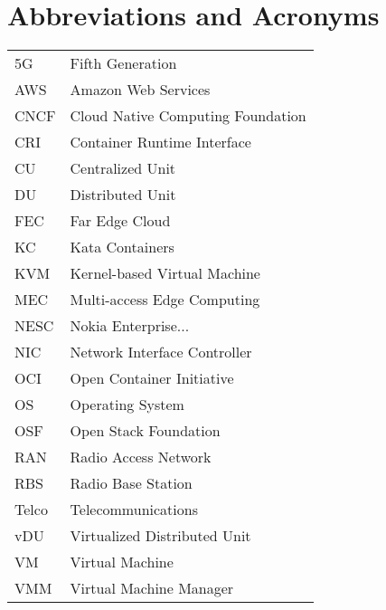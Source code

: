 \chapter*{Abbreviations and Acronyms}

\noindent
\begin{longtable}{@{}p{}p{}@{}}
5G & Fifth Generation \\
AWS & Amazon Web Services \\
CNCF & Cloud Native Computing Foundation \\
CRI & Container Runtime Interface \\
CU & Centralized Unit \\
DU & Distributed Unit \\
FEC & Far Edge Cloud \\
KC & Kata Containers \\
KVM & Kernel-based Virtual Machine \\
MEC & Multi-access Edge Computing \\
NESC & Nokia Enterprise... \\
NIC & Network Interface Controller \\
OCI & Open Container Initiative \\
OS & Operating System \\
OSF & Open Stack Foundation \\
RAN & Radio Access Network \\
RBS & Radio Base Station \\
Telco & Telecommunications \\
vDU & Virtualized Distributed Unit \\
VM & Virtual Machine \\
VMM & Virtual Machine Manager \\



\end{longtable}
